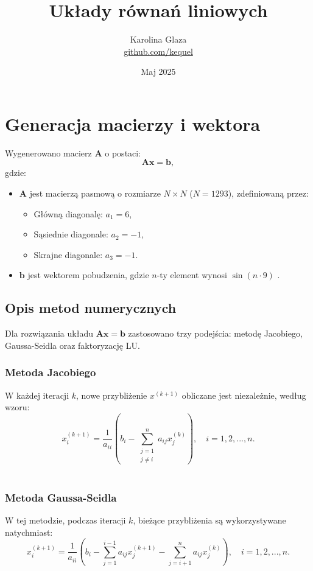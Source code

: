 \documentclass{article}
\title{Układy równań liniowych}
\author{Karolina Glaza \\ \href{https://github.com/kequel}{github.com/kequel}}
\date{Maj 2025}
\begin{document}
\maketitle

\section{Generacja macierzy i wektora}
Wygenerowano macierz 
$\mathbf{A}$ o postaci:
\[
\mathbf{Ax} = \mathbf{b},
\]
gdzie:
\begin{itemize}
    \item $\mathbf{A}$ jest macierzą pasmową o rozmiarze $N \times N$ ($N = 1293$), zdefiniowaną przez:
    \begin{itemize}
        \item Główną diagonalę: $a_1 = 6$,
        \item Sąsiednie diagonale: $a_2 = -1$,
        \item Skrajne diagonale: $a_3 = -1$.
    \end{itemize}
    \item $\mathbf{b}$ jest wektorem pobudzenia, gdzie $n$-ty element wynosi $\sin(n \cdot 9)$ . \\
\end{itemize}

\subsection*{Opis metod numerycznych}
Dla rozwiązania układu $\mathbf{Ax} = \mathbf{b}$ zastosowano trzy podejścia: metodę Jacobiego, Gaussa-Seidla oraz faktoryzację LU.

\subsubsection*{Metoda Jacobiego}
W każdej iteracji $k$, nowe przybliżenie $x^{(k+1)}$ obliczane jest niezależnie, według wzoru:
\begin{equation}
x_i^{(k+1)} = \frac{1}{a_{ii}} \left( b_i - \sum_{\substack{j=1 \\ j \ne i}}^n a_{ij} x_j^{(k)} \right), \quad i = 1, 2, ..., n.
\end{equation}
\\

\subsubsection*{Metoda Gaussa-Seidla} 
W tej metodzie, podczas iteracji $k$, bieżące przybliżenia są wykorzystywane natychmiast:
\begin{equation}
x_i^{(k+1)} = \frac{1}{a_{ii}} \left( b_i - \sum_{j=1}^{i-1} a_{ij} x_j^{(k+1)} - \sum_{j=i+1}^{n} a_{ij} x_j^{(k)} \right), \quad i = 1, 2, ..., n.
\end{equation}
\\
\end{document}
